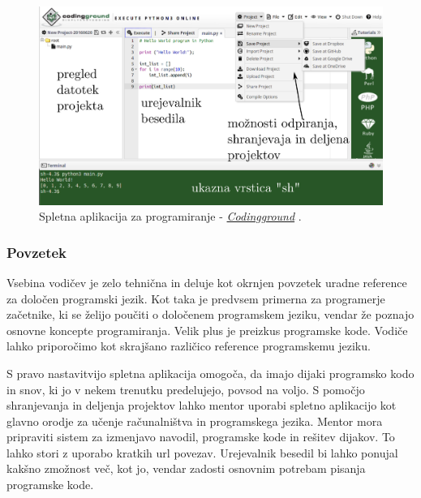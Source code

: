 \begin{figure}[h!]
  \centering
    \includegraphics [width=0.65\linewidth, keepaspectratio =
   1] {./images/sc_web/tutpoint_cg-v01.jpg}
   \caption{Spletna aplikacija za programiranje -
     \emph{\href{http://www.tutorialspoint.com/codingground.htm}{Codingground}}
     \cite{web:tutorialspoint:codingground}.}
    \label{fig:web:tutpoint:cg}
\end{figure}

\subsubsection{Povzetek}
\label{sec:povzetek_tutpoint}

Vsebina vodičev je zelo tehnična in deluje kot okrnjen povzetek uradne
reference za določen programski jezik. Kot taka je predvsem primerna
za programerje začetnike, ki se želijo poučiti o določenem programskem
jeziku, vendar že poznajo osnovne koncepte programiranja. Velik plus
je preizkus programske kode. Vodiče lahko priporočimo kot
skrajšano različico reference programskemu jeziku.

S pravo nastavitvijo spletna aplikacija omogoča, da imajo dijaki
programsko kodo in snov, ki jo v nekem trenutku predelujejo, povsod na
voljo. S pomočjo shranjevanja in deljenja projektov lahko mentor
uporabi spletno aplikacijo kot glavno orodje za učenje računalništva
in programskega jezika. Mentor mora pripraviti sistem za izmenjavo
navodil, programske kode in rešitev dijakov. To lahko stori z uporabo
kratkih url povezav. Urejevalnik besedil bi lahko ponujal kakšno
zmožnost več, kot jo, vendar zadosti osnovnim potrebam pisanja
programske kode.


